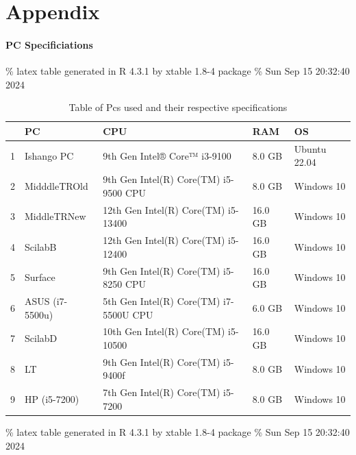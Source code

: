 \documentclass[12pt,halfline,a4paper,]{ouparticle}
\begin{document}
\newpage

\hypertarget{appendix}{%
\section{Appendix}\label{appendix}}

\hypertarget{pc-specificiations}{%
\paragraph{PC Specificiations}\label{pc-specificiations}}

\hfill\break

\% latex table generated in R 4.3.1 by xtable 1.8-4 package \% Sun Sep
15 20:32:40 2024

\begin{table}[ht]
\centering
\begin{tabular}{rllll}
  \hline
 & PC & CPU & RAM & OS \\ 
  \hline
1 & Ishango PC &  9th Gen Intel® Core™ i3-9100  &  8.0 GB  & Ubuntu 22.04 \\ 
  2 & MidddleTROld &  9th Gen Intel(R) Core(TM) i5-9500 CPU  &  8.0 GB  &   Windows 10 \\ 
  3 & MiddleTRNew  &  12th Gen Intel(R) Core(TM) i5-13400  &  16.0 GB  &   Windows 10 \\ 
  4 & ScilabB  &   12th Gen Intel(R) Core(TM) i5-12400  &   16.0 GB   &   Windows 10 \\ 
  5 & Surface  &   9th Gen Intel(R) Core(TM) i5-8250 CPU  &   16.0 GB   &   Windows 10 \\ 
  6 & ASUS (i7-5500u)  &   5th Gen Intel(R) Core(TM) i7-5500U CPU  &   6.0 GB   &   Windows 10 \\ 
  7 & ScilabD  &   10th Gen Intel(R) Core(TM) i5-10500  &   16.0 GB   &   Windows 10 \\ 
  8 & LT  &   9th Gen Intel(R) Core(TM) i5-9400f  &   8.0 GB   &   Windows 10 \\ 
  9 & HP (i5-7200)  &   7th Gen Intel(R) Core(TM) i5-7200  &   8.0 GB   &   Windows 10 \\ 
   \hline
\end{tabular}
\caption{Table of Pcs used and their respective specifications} 
\end{table}

\% latex table generated in R 4.3.1 by xtable 1.8-4 package \% Sun Sep
15 20:32:40 2024
\end{document}
